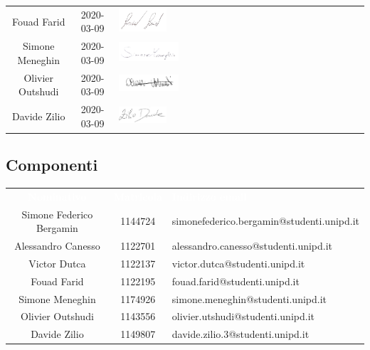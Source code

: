 \begin{table}[H]
\begin{center}
\begin{tabular}{ c c C{6cm}}
		Fouad Farid & 2020-03-09 & \includegraphics[scale=0.2, width=0.2\textwidth]{img/firme/farid.png}\\
		Simone Meneghin & 2020-03-09 & \includegraphics[scale=0.3, width=0.25\textwidth]{img/firme/meneghin.png}\\
		Olivier Outshudi & 2020-03-09 & \includegraphics[scale=0.3, width=0.25\textwidth]{img/firme/outshudi.png}\\
		Davide Zilio & 2020-03-09 & \includegraphics[scale=0.2, width=0.2\textwidth]{img/firme/zilio.png}\\
	\end{tabular}
	\end{center}
\end{table}

\subsection{Componenti}
\begin{table}[H]	
	\begin{center}
	\begin{tabular}{ c c C{8.3cm} }
		\textcolor{white}{\textbf{Nominativo}} & \textcolor{white}{\textbf{Matricola}} & \textcolor{white}{\textbf{Indirizzo email}} \\
		Simone Federico Bergamin & 1144724  & simonefederico.bergamin@studenti.unipd.it \\
		Alessandro Canesso & 1122701 & alessandro.canesso@studenti.unipd.it\\
		Victor Dutca & 1122137 & victor.dutca@studenti.unipd.it\\
		Fouad Farid & 1122195 & fouad.farid@studenti.unipd.it\\
		Simone Meneghin & 1174926 & simone.meneghin@studenti.unipd.it\\
		Olivier Outshudi & 1143556 & olivier.utshudi@studenti.unipd.it\\
		Davide Zilio & 1149807 & davide.zilio.3@studenti.unipd.it\\
	\end{tabular}
	\end{center}
\end{table}